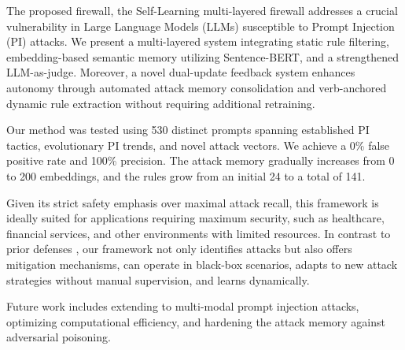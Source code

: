 \documentclass[10pt, conference, compsoc]{IEEEtran}
\begin{document}
The proposed firewall, the Self-Learning multi-layered firewall addresses a crucial vulnerability in Large Language Models (LLMs) susceptible to Prompt Injection (PI) attacks. We present a multi-layered system integrating static rule filtering, embedding-based semantic memory utilizing Sentence-BERT, and a strengthened LLM-as-judge. Moreover, a novel dual-update feedback system enhances autonomy through automated attack memory consolidation and verb-anchored dynamic rule extraction without requiring additional retraining.

Our method was tested using 530 distinct prompts spanning established PI tactics, evolutionary PI trends, and novel attack vectors. We achieve a 0\% false positive rate and 100\% precision. The attack memory gradually increases from 0 to 200 embeddings, and the rules grow from an initial 24 to a total of 141.

Given its strict safety emphasis over maximal attack recall, this framework is ideally suited for applications requiring maximum security, such as healthcare, financial services, and other environments with limited resources. In contrast to prior defenses \cite{jacob2024promptshield, yao2025controlnet, li2024injecguard, li2025piguard}, our framework not only identifies attacks but also offers mitigation mechanisms, can operate in black-box scenarios, adapts to new attack strategies without manual supervision, and learns dynamically.

Future work includes extending to multi-modal prompt injection attacks, optimizing computational efficiency, and hardening the attack memory against adversarial poisoning.



\end{document}
